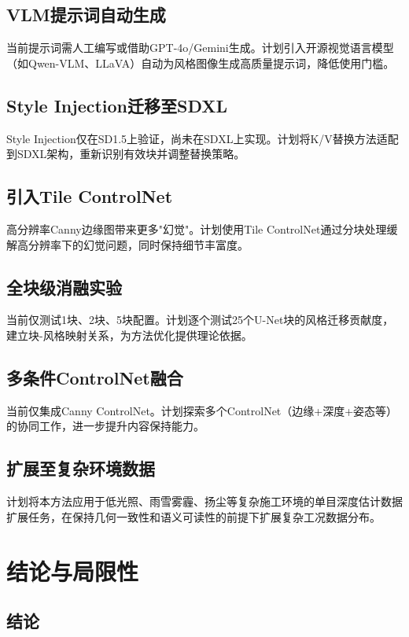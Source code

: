 \documentclass[twocolumn,a4paper,11pt]{ctexart}
\begin{document}
\subsection{VLM提示词自动生成}
当前提示词需人工编写或借助GPT-4o/Gemini生成。计划引入开源视觉语言模型（如Qwen-VLM、LLaVA）自动为风格图像生成高质量提示词，降低使用门槛。

\subsection{Style Injection迁移至SDXL}
Style Injection仅在SD1.5上验证，尚未在SDXL上实现。计划将K/V替换方法适配到SDXL架构，重新识别有效块并调整替换策略。

\subsection{引入Tile ControlNet}
高分辨率Canny边缘图带来更多"幻觉"。计划使用Tile ControlNet通过分块处理缓解高分辨率下的幻觉问题，同时保持细节丰富度。

\subsection{全块级消融实验}
当前仅测试1块、2块、5块配置。计划逐个测试25个U-Net块的风格迁移贡献度，建立块-风格映射关系，为方法优化提供理论依据。

\subsection{多条件ControlNet融合}
当前仅集成Canny ControlNet。计划探索多个ControlNet（边缘+深度+姿态等）的协同工作，进一步提升内容保持能力。

\subsection{扩展至复杂环境数据}
计划将本方法应用于低光照、雨雪雾霾、扬尘等复杂施工环境的单目深度估计数据扩展任务，在保持几何一致性和语义可读性的前提下扩展复杂工况数据分布。

\section{结论与局限性}

\subsection{结论}
\end{document}
